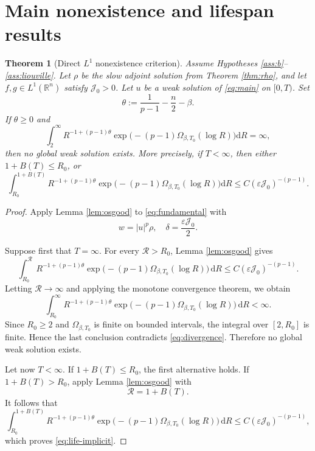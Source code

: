 \documentclass[11pt,reqno]{amsart}
\newtheorem{theorem}{Theorem}
\theoremstyle{definition}
\theoremstyle{remark}
\begin{document}
	\section{Main nonexistence and lifespan results} \label{sec:main-results}
	
	\begin{theorem}[Direct $L^1$ nonexistence criterion]
		\label{thm:abstract-main}
		Assume Hypotheses \ref{ass:b}--\ref{ass:liouville}. Let $\rho$ be the slow adjoint solution from Theorem \ref{thm:rho}, and let $f,g\in L^1(\mathbb{R}^n)$ satisfy $\mathcal{J}_0>0$. Let $u$ be a weak solution of \eqref{eq:main} on $[0,T)$. Set
		$$
		\theta:=\frac{1}{p-1}-\frac{n}{2}-\beta.
		$$
		If $\theta\geq0$ and
		\begin{equation}
			\label{eq:divergence}
			\int_2^\infty
			R^{-1+(p-1)\theta}
			\exp\bigl(-(p-1)\Omega_{\beta,T_0}(\log R)\bigr)\mathrm{d}R
			=\infty,
		\end{equation}
		then no global weak solution exists. More precisely, if $T<\infty$, then either $1+B(T)\leq R_0$, or
		\begin{equation}
			\label{eq:life-implicit}
			\int_{R_0}^{1+B(T)}
			R^{-1+(p-1)\theta}
			\exp\bigl(-(p-1)\Omega_{\beta,T_0}(\log R)\bigr)\mathrm{d}R
			\leq C(\varepsilon\mathcal{J}_0)^{-(p-1)}.
		\end{equation}
	\end{theorem}
	
	\begin{proof}
		Apply Lemma \ref{lem:osgood} to \eqref{eq:fundamental} with
		$$
		w=|u|^p\rho,
		\quad
		\delta=\frac{\varepsilon\mathcal J_0}{2}.
		$$
		
		Suppose first that $T=\infty$. For every
		$\mathcal R>R_0$, Lemma \ref{lem:osgood} gives
		$$
		\int_{R_0}^{\mathcal R}
		R^{-1+(p-1)\theta}
		\exp\bigl(
		-(p-1)\Omega_{\beta,T_0}(\log R)
		\bigr)\,\mathrm{d}R
		\leq
		C(\varepsilon\mathcal J_0)^{-(p-1)}.
		$$
		Letting $\mathcal R\to\infty$ and applying the monotone convergence
		theorem, we obtain
		$$
		\int_{R_0}^{\infty}
		R^{-1+(p-1)\theta}
		\exp\bigl(
		-(p-1)\Omega_{\beta,T_0}(\log R)
		\bigr)\,\mathrm{d}R
		<\infty.
		$$
		Since $R_0\geq2$ and $\Omega_{\beta,T_0}$ is finite on bounded
		intervals, the integral over $[2,R_0]$ is finite. Hence the last
		conclusion contradicts \eqref{eq:divergence}. Therefore no global weak
		solution exists.
		
		Let now $T<\infty$. If $1+B(T)\leq R_0$, the first alternative holds.
		If $1+B(T)>R_0$, apply Lemma \ref{lem:osgood} with
		$$
		\mathcal R=1+B(T).
		$$
		It follows that
		$$
		\int_{R_0}^{1+B(T)}
		R^{-1+(p-1)\theta}
		\exp\bigl(
		-(p-1)\Omega_{\beta,T_0}(\log R)
		\bigr)\,\mathrm{d}R
		\leq
		C(\varepsilon\mathcal J_0)^{-(p-1)},
		$$
		which proves \eqref{eq:life-implicit}.
	\end{proof}
	
\end{document}
